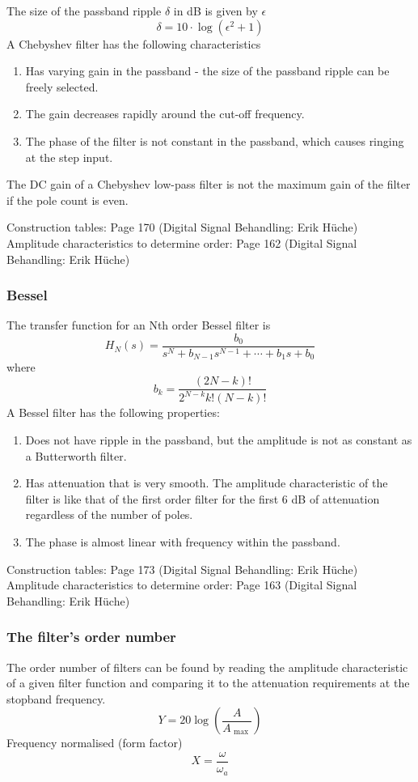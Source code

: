 The size of the passband ripple $\delta$ in dB is given by $\epsilon$
$$\delta=10\cdot \log(\epsilon^2+1)$$
A Chebyshev filter has the following characteristics 
\begin{enumerate}
  \item Has varying gain in the passband - the size of the passband ripple can be freely selected. 
  \item The gain decreases rapidly around the cut-off frequency. 
  \item The phase of the filter is not constant in the passband, which causes ringing at the step input.
\end{enumerate}
The DC gain of a Chebyshev low-pass filter is not the maximum gain of the filter if the pole count is even.

Construction tables: Page 170 (Digital Signal Behandling: Erik Hüche)\\
Amplitude characteristics to determine order: Page 162 (Digital Signal Behandling: Erik Hüche)

\subsubsection{Bessel}
The transfer function for an Nth order Bessel filter is
$$H_{N}(s)=\frac{b_{0}}{s^N+b_{N-1} s^{N-1}+\cdots +b_{1}s+b_{0}} $$
where
$$b_{k}=\frac{(2N-k)!}{2^{N-k}k!(N-k)!}$$
A Bessel filter has the following properties:
\begin{enumerate}
  \item Does not have ripple in the passband, but the amplitude is not as constant as a Butterworth filter. 
  \item Has attenuation that is very smooth. The amplitude characteristic of the filter is like that of the first order filter for the first 6 dB of attenuation regardless of the number of poles. 
  \item The phase is almost linear with frequency within the passband.
\end{enumerate}

Construction tables: Page 173 (Digital Signal Behandling: Erik Hüche)\\
Amplitude characteristics to determine order: Page 163 (Digital Signal Behandling: Erik Hüche)

\subsubsection{The filter's order number}
The order number of filters can be found by reading the amplitude characteristic of a given filter function and comparing it to the attenuation requirements at the stopband frequency. 
$$Y=20\log\left( \frac{A}{A_{\text{ max }}} \right)$$
Frequency normalised (form factor)
$$X=\frac{\omega}{\omega_{a}}$$



